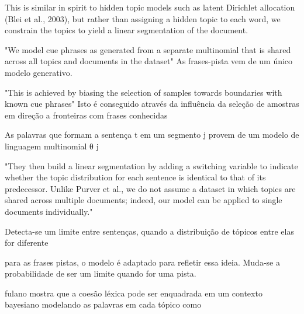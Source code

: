 
This is similar in spirit to hidden topic models such as latent Dirichlet allocation (Blei et al., 2003), but rather than assigning a hidden topic to each word, we constrain the topics to yield a linear segmentation of the document.


"We model cue phrases as generated from a separate multinomial that is shared across all topics and documents in the dataset"
As frases-pista vem de um único modelo generativo.


"This is achieved by biasing the selection of samples towards boundaries with known cue phrases"
{Isto é conseguido através da influência da seleção de amostras em direção a fronteiras com frases conhecidas}


{As palavras que formam a sentença t em um segmento j provem de um modelo de linguagem multinomial θ j}



"They then build a linear segmentation by adding a switching variable to indicate whether the topic distribution for each sentence is identical to that of its predecessor. Unlike Purver et al., we do not assume a dataset in which topics are shared across multiple documents; indeed, our model can be applied to single documents individually."

{Detecta-se um limite entre sentenças, quando a distribuição de tópicos entre elas for diferente}



para as frases pistas, o modelo é adaptado para refletir essa ideia. Muda-se a probabilidade de ser um limite quando for uma pista.

fulano mostra que a coesão léxica pode ser enquadrada em um contexto bayesiano modelando as palavras em cada tópico como 








